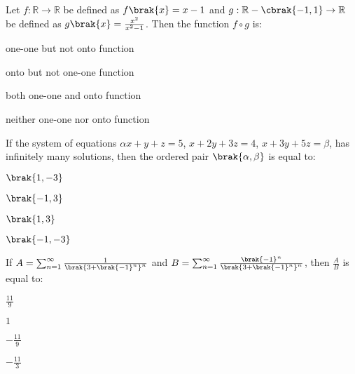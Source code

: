 \iffalse
\title{2022}
\author{EE24Btech11024}
\section{mcq-single}
\fi

\item Let $f:\mathbb{R}\rightarrow\mathbb{R}$ be defined as $f\brak{x}=x-1$ and $g:\mathbb{R}-\cbrak{-1,1}\rightarrow\mathbb{R}$ be defined as $g\brak{x}=\frac{x^2}{x^2-1}$. Then the function $f\circ g$ is:

\hfill{}
\begin{enumerate}
\begin{multicols}{2}
\item one-one but not onto function
\item onto but not one-one function
\item both one-one and onto function
\item neither one-one nor onto function
\end{multicols}
\end{enumerate}


\item If the system of equations $\alpha x+y+z=5$, $x+2y+3z=4$, $x+3y+5z=\beta$, has infinitely many solutions, then the ordered pair $\brak{\alpha,\beta}$ is equal to:

\hfill{}
\begin{enumerate}
\begin{multicols}{4}
\item $\brak{1,-3}$
\item $\brak{-1,3}$
\item $\brak{1,3}$
\item $\brak{-1,-3}$
\end{multicols}
\end{enumerate}

\item If $A = \sum_{n=1}^{\infty}\frac{1}{\brak{3+\brak{-1}^n}^n}$ and $B = \sum_{n=1}^{\infty}\frac{\brak{-1}^n}{\brak{3+\brak{-1}^n}^n}$, then $\frac{A}{B}$ is equal to:

\hfill{}
\begin{enumerate}
\begin{multicols}{4}
\item $\frac{11}{9}$
\item $1$
\item $-\frac{11}{9}$
\item $-\frac{11}{3}$
\end{multicols}
\end{enumerate}

